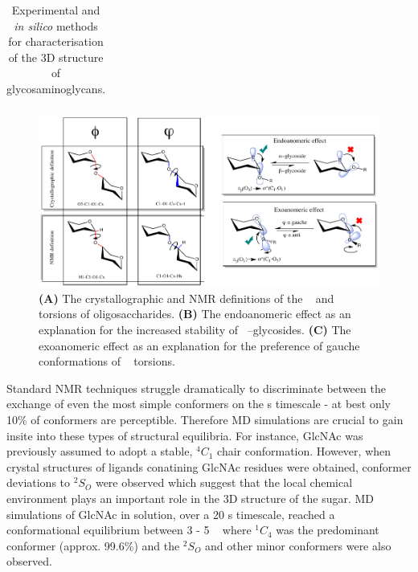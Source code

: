 \documentclass[journal=jctcce,manuscript=article]{achemso}
\begin{document}
{{\begin{table}[bl!]
\begin{tabular}{p{2cm}p{5.5cm}p{7.5cm}}
    \end{tabular}
    \caption{Experimental and \textit{in silico} methods for characterisation of the 3D structure of glycosaminoglycans.}
    \label{tab:GAGprotein}
\end{table}
}
\begin{figure}[bl!]
    \centering
    \includegraphics[width=14cm]{phi_psi_endo_exo.pdf}
    \caption{\textbf{(A)} The crystallographic and NMR definitions of the \textphi~ and \textpsi~ torsions of oligosaccharides. \textbf{(B)} The endoanomeric effect as an explanation for the increased stability of \textalpha~--glycosides. \textbf{(C)} The exoanomeric effect as an explanation for the preference of gauche conformations of \textpsi~ torsions. }
    \label{fig:phipsiendoexo}
\end{figure}

Standard NMR techniques struggle dramatically to discriminate between the exchange of even the most simple conformers on the \textmu s timescale - at best only 10\% of conformers are perceptible.\cite{Sattelle2011IsChair} Therefore \ac{MD} simulations are crucial to gain insite into these types of structural equilibria.\cite{Woods2018PredictingComplexes} 
For instance, \ac{GlcNAc} was previously assumed to adopt a stable, $^{4}C_{1}$ chair conformation.\cite{Sattelle2011IsChair} 
However, when crystal structures of ligands conatining GlcNAc residues were obtained, conformer deviations to $^{2}S_{O}$ were observed which suggest that the local chemical environment plays an important role in the 3D structure of the sugar. 
\ac{MD} simulations of GlcNAc in solution, over a 20 \textmu s timescale, reached a conformational equilibrium between 3 - 5 \textmu~ where $^{1}C_{4}$ was the predominant conformer (approx. 99.6\%) and the $^{2}S_{O}$ and other minor conformers were also observed.



}
\end{document}
